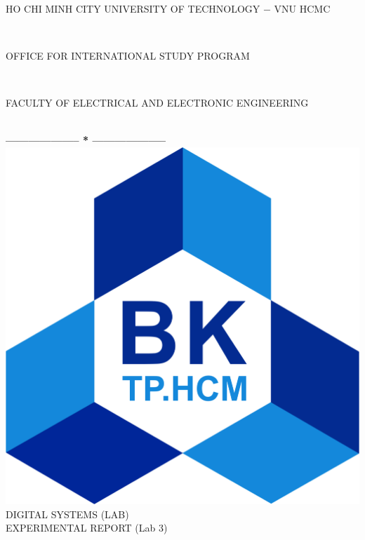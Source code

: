 \documentclass[13pt,a4paper]{report}
\begin{document}
\fontsize{13pt}{18pt}\selectfont
\begin{titlepage}
\thispagestyle{empty}
\thisfancypage{%
\setlength{\fboxsep}{0pt}%
\fbox}{} %
\

\begin{center}
\begin{large}
HO CHI MINH CITY UNIVERSITY OF TECHNOLOGY $-$ VNU HCMC
\end{large} \\
\begin{large}
OFFICE FOR INTERNATIONAL STUDY PROGRAM
\end{large} \\
\begin{large}
FACULTY OF ELECTRICAL AND ELECTRONIC ENGINEERING
\end{large} \\
\textbf{--------------------  *  --------------------}\\[4cm]
\includegraphics[scale=0.1]{logobk.png}\\[1cm]
{\fontsize{20pt}{1}\selectfont DIGITAL SYSTEMS (LAB)}\\
{\fontsize{20pt}{1}\selectfont EXPERIMENTAL REPORT (Lab 3)}\\[2.5cm]
\end{center}


\end{titlepage}
\end{document}
